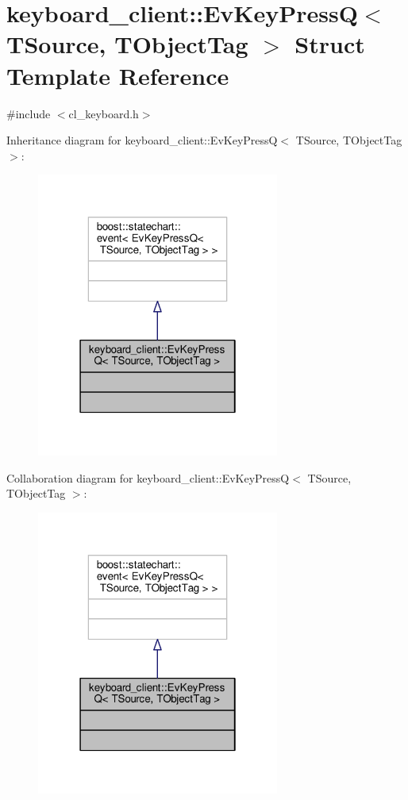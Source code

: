 \hypertarget{structkeyboard__client_1_1EvKeyPressQ}{}\section{keyboard\+\_\+client\+:\+:Ev\+Key\+PressQ$<$ T\+Source, T\+Object\+Tag $>$ Struct Template Reference}
\label{structkeyboard__client_1_1EvKeyPressQ}


{\ttfamily \#include $<$cl\+\_\+keyboard.\+h$>$}



Inheritance diagram for keyboard\+\_\+client\+:\+:Ev\+Key\+PressQ$<$ T\+Source, T\+Object\+Tag $>$\+:\nopagebreak
\begin{figure}[H]
\begin{center}
\leavevmode
\includegraphics[width=226pt]{structkeyboard__client_1_1EvKeyPressQ__inherit__graph}
\end{center}
\end{figure}


Collaboration diagram for keyboard\+\_\+client\+:\+:Ev\+Key\+PressQ$<$ T\+Source, T\+Object\+Tag $>$\+:\nopagebreak
\begin{figure}[H]
\begin{center}
\leavevmode
\includegraphics[width=226pt]{structkeyboard__client_1_1EvKeyPressQ__coll__graph}
\end{center}
\end{figure}


